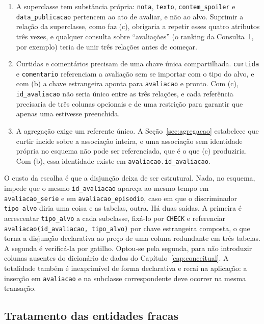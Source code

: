 \documentclass[a4paper,12pt,oneside,openany]{book}
\newif\iforientacoes
\newcommand{\orientacao}[1]{%
    \iforientacoes
        \begin{quote}
        \small\itshape\textbf{Orientação:} #1
        \end{quote}
    \fi
}
\newcommand{\id}[1]{\texttt{#1}}
\begin{document}
\begin{enumerate}[nosep]
    \item A superclasse tem substância própria: \id{nota}, \id{texto},
\id{contem\_spoiler} e \id{data\_publicacao} pertencem ao ato de avaliar, e não ao
alvo. Suprimir a relação da superclasse, como faz (c), obrigaria a repetir esses
quatro atributos três vezes, e qualquer consulta sobre ``avaliações'' (o ranking da
Consulta~1, por exemplo) teria de unir três relações antes de começar.
    \item Curtidas e comentários precisam de uma chave única compartilhada.
\id{curtida} e \id{comentario} referenciam a avaliação sem se importar com o tipo do
alvo, e com (b) a chave estrangeira aponta para \id{avaliacao} e pronto. Com (c),
\id{id\_avaliacao} não seria único entre as três relações, e cada referência
precisaria de três colunas opcionais e de uma restrição para garantir que apenas uma
estivesse preenchida.
    \item A agregação exige um referente único. A Seção~\ref{sec:agregacao}
estabelece que curtir incide sobre a associação inteira, e uma associação sem
identidade própria no esquema não pode ser referenciada, que é o que (c) produziria.
Com (b), essa identidade existe em \id{avaliacao.id\_avaliacao}.
\end{enumerate}

O custo da escolha é que a disjunção deixa de ser estrutural. Nada, no esquema,
impede que o mesmo \id{id\_avaliacao} apareça ao mesmo tempo em
\id{avaliacao\_serie} e em \id{avaliacao\_episodio}, caso em que o discriminador
\id{tipo\_alvo} diria uma coisa e as tabelas, outra. Há duas saídas. A primeira é
acrescentar \id{tipo\_alvo} a cada subclasse, fixá-lo por \id{CHECK} e referenciar
\id{avaliacao(id\_avaliacao, tipo\_alvo)} por chave estrangeira composta, o que
torna a disjunção declarativa ao preço de uma coluna redundante em três tabelas. A
segunda é verificá-la por gatilho. Optou-se pela segunda, para não introduzir
colunas ausentes do dicionário de dados do Capítulo~\ref{cap:conceitual}. A
totalidade também é inexprimível de forma declarativa e recai na aplicação: a
inserção em \id{avaliacao} e na subclasse correspondente deve ocorrer na mesma
transação.

\subsection{Tratamento das entidades fracas}

\orientacao{Expliquem a diferença entre a chave da entidade fraca no modelo
conceitual (chave parcial + chave do proprietário) e a solução adotada no esquema
físico. No projeto, adotou-se chave primária substituta (\id{id\_temporada},
\id{id\_episodio}) acompanhada de restrição de unicidade sobre o par
(proprietário, número). Justifiquem: a chave composta natural funcionaria, mas se
propagaria para todas as tabelas que referenciam episódio -- \id{registro} e
\id{avaliacao\_episodio} -- aumentando o tamanho das chaves estrangeiras sem
ganho semântico. A restrição \textbf{UNIQUE} preserva integralmente a regra
original (RN06 e RN07).}
\end{document}
